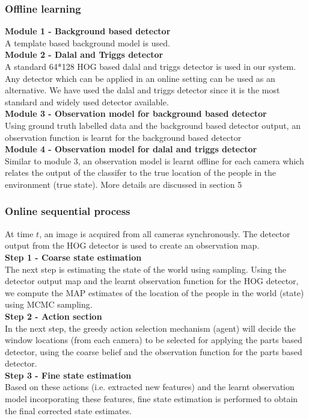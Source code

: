\documentclass[10pt,twocolumn,letterpaper]{article}
\begin{document}
\subsubsection{Offline learning}
\textbf{Module 1 - Background based detector}\\
A template based background model is used.\\
\textbf{Module 2 - Dalal and Triggs detector}\\
A standard 64*128 HOG based dalal and triggs detector is used in our system. Any detector which can be applied in an online setting can be used as an alternative. We have used the dalal and triggs detector since it is the most standard and widely used detector available.\\ 
\textbf{Module 3 - Observation model for background based detector}\\
Using ground truth labelled data and the background based detector output, an observation function is learnt for the background based detector\\
\textbf{Module 4 - Observation model for dalal and triggs detector}\\ 
Similar to module 3, an observation model is learnt offline for each camera which relates the output of the classifer to the true location of the people in the environment (true state). More details are discussed in section 5\\

\subsubsection{Online sequential process}
At time $t $, an image is acquired from all cameras synchronously. The detector output from the HOG detector is used to create an observation map.\\
\textbf{Step 1 - Coarse state estimation}\\
The next step is estimating the state of the world using sampling. Using the detector output map and the learnt observation function for the HOG detector, we compute the MAP estimates of the location of the people in the world (state) using MCMC sampling.\\ 
\textbf{Step 2 - Action section}\\
In the next step, the greedy action selection mechanism (agent) will
decide the window locations (from each camera) to be selected for applying the parts based detector, using the coarse belief and the observation function for the parts based detector.\\
\textbf{Step 3 - Fine state estimation}\\
Based on these actions (i.e. extracted new features)
and the learnt observation model incorporating these features, fine state estimation is performed to obtain the final corrected state estimates.
\end{document}
